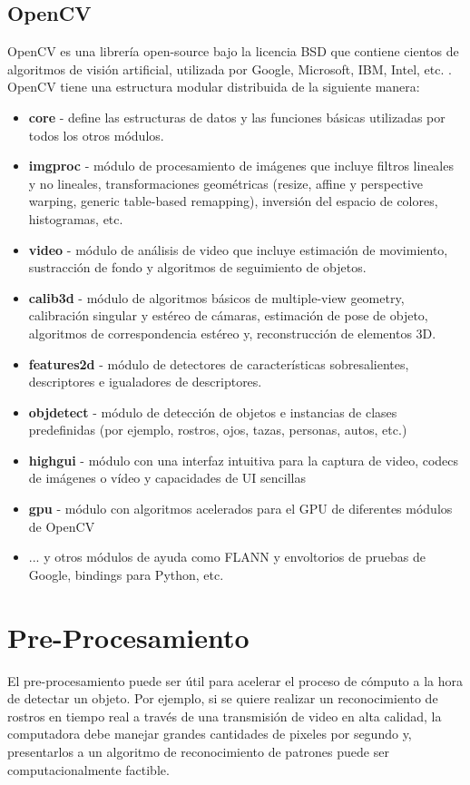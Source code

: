 \subsection{OpenCV}
OpenCV es una librería open-source bajo la licencia BSD que contiene cientos de algoritmos de visión artificial, utilizada por Google, Microsoft, IBM, Intel, etc. \cite{OpenCV2016-bv}. OpenCV tiene una estructura modular distribuida de la siguiente manera:
\begin{itemize}
\item \textbf{core} - define las estructuras de datos y las funciones básicas utilizadas por todos los otros módulos.
\item \textbf{imgproc} - módulo de procesamiento de imágenes que incluye filtros lineales y no lineales, transformaciones geométricas (resize, affine y perspective warping, generic table-based remapping), inversión del espacio de colores, histogramas, etc.
\item \textbf{video} - módulo de análisis de video que incluye estimación de movimiento, sustracción de fondo y algoritmos de seguimiento de objetos.
\item \textbf{calib3d} - módulo de algoritmos básicos de multiple-view geometry, calibración singular y estéreo de cámaras, estimación de pose de objeto, algoritmos de correspondencia estéreo y, reconstrucción de elementos 3D.
\item \textbf{features2d} - módulo de detectores de características sobresalientes, descriptores e igualadores de descriptores.
\item \textbf{objdetect} - módulo de detección de objetos e instancias de clases predefinidas (por ejemplo, rostros, ojos, tazas, personas, autos, etc.)
\item \textbf{highgui} - módulo con una interfaz intuitiva para la captura de video, codecs de imágenes o vídeo y capacidades de UI sencillas
\item \textbf{gpu} - módulo con algoritmos acelerados para el GPU de diferentes módulos de OpenCV
\item ... y otros módulos de ayuda como FLANN y envoltorios de pruebas de Google, bindings para Python, etc.    
\end{itemize}


\section{Pre-Procesamiento}
El pre-procesamiento puede ser útil para acelerar el proceso de cómputo a la hora de detectar un objeto. Por ejemplo, si se quiere realizar un reconocimiento de rostros en tiempo real a través de una transmisión de video en alta calidad, la computadora debe manejar grandes cantidades de pixeles por segundo y, presentarlos a un algoritmo de reconocimiento de patrones puede ser computacionalmente factible. 

